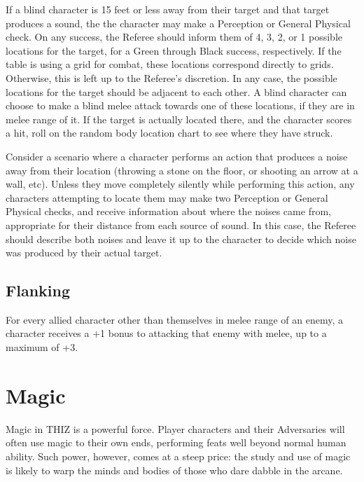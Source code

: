 \documentclass[oneside]{book}
\begin{document}
\begin{multicols}{2}
If a blind character is 15 feet or less away from their target and that target produces a sound, the the character may make a Perception or General Physical check. On any success, the Referee should inform them of 4, 3, 2, or 1 possible locations for the target, for a Green through Black success, respectively. If the table is using a grid for combat, these locations correspond directly to grids. Otherwise, this is left up to the Referee's discretion. In any case, the possible locations for the target should be adjacent to each other. A blind character can choose to make a blind melee attack towards one of these locations, if they are in melee range of it. If the target is actually located there, and the character scores a hit, roll on the random body location chart to see where they have struck. 

Consider a scenario where a character performs an action that produces a noise away from their location (throwing a stone on the floor, or shooting an arrow at a wall, etc). Unless they move completely silently while performing this action, any characters attempting to locate them may make two Perception or General Physical checks, and receive information about where the noises came from, appropriate for their distance from each source of sound. In this case, the Referee should describe both noises and leave it up to the character to decide which noise was produced by their actual target. 

\section{Flanking}
For every allied character other than themselves in melee range of an enemy, a character receives a +1 bonus to attacking that enemy with melee, up to a maximum of +3.

\end{multicols}

\chapter{Magic}
Magic in THIZ is a powerful force. Player characters and their Adversaries will often use magic to their own ends, performing feats well beyond normal human ability. Such power, however, comes at a steep price: the study and use of magic is likely to warp the minds and bodies of those who dare dabble in the arcane.
\end{document}
